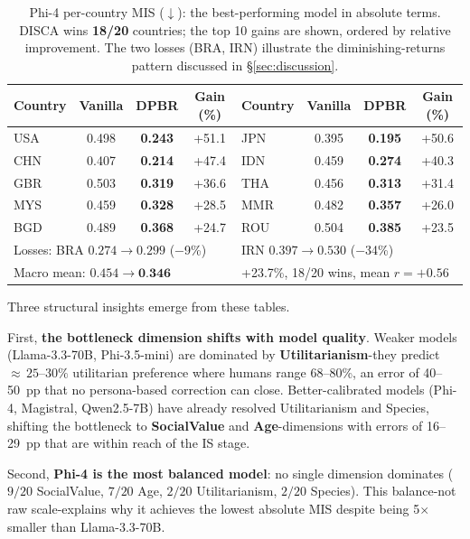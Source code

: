 \documentclass{article}
\newcommand{\gain}[1]{\textcolor{improvegreen}{#1}}
\newcommand{\loss}[1]{\textcolor{worsered}{#1}}
\begin{document}
\begin{table}[h]\centering\scriptsize
\caption{Phi-4 per-country MIS ($\downarrow$): the best-performing model in
absolute terms. DISCA wins \textbf{18/20} countries; the top 10 gains are
shown, ordered by relative improvement. The two losses (BRA, IRN) illustrate
the diminishing-returns pattern discussed in \S\ref{sec:discussion}.}
\label{tab:phi4_percountry}
\setlength{\tabcolsep}{4pt}
\begin{tabular}{lccc|lccc}\toprule
Country & Vanilla & DPBR & Gain (\%) & Country & Vanilla & DPBR & Gain (\%) \\\midrule
USA & 0.498 & \textbf{0.243} & \gain{+51.1} & JPN & 0.395 & \textbf{0.195} & \gain{+50.6} \\
CHN & 0.407 & \textbf{0.214} & \gain{+47.4} & IDN & 0.459 & \textbf{0.274} & \gain{+40.3} \\
GBR & 0.503 & \textbf{0.319} & \gain{+36.6} & THA & 0.456 & \textbf{0.313} & \gain{+31.4} \\
MYS & 0.459 & \textbf{0.328} & \gain{+28.5} & MMR & 0.482 & \textbf{0.357} & \gain{+26.0} \\
BGD & 0.489 & \textbf{0.368} & \gain{+24.7} & ROU & 0.504 & \textbf{0.385} & \gain{+23.5} \\
\midrule
\multicolumn{4}{l|}{Losses: BRA $0.274 \to 0.299$ (\loss{$-$9\%})} &
\multicolumn{4}{l}{IRN $0.397 \to 0.530$ (\loss{$-$34\%})} \\
\multicolumn{4}{l|}{Macro mean: $0.454 \to \textbf{0.346}$} &
\multicolumn{4}{l}{\gain{+23.7\%}, 18/20 wins, mean $r = +0.56$} \\
\bottomrule
\end{tabular}
\end{table}

Three structural insights emerge from these tables.

First, \textbf{the bottleneck dimension shifts with model quality}.
Weaker models (Llama-3.3-70B, Phi-3.5-mini) are dominated by
\textbf{Utilitarianism}-they predict ${\approx}\,25$--$30\%$ utilitarian
preference where humans range 68--80\%, an error of 40--50~pp that no
persona-based correction can close.
Better-calibrated models (Phi-4, Magistral, Qwen2.5-7B) have already resolved
Utilitarianism and Species, shifting the bottleneck to
\textbf{SocialValue} and \textbf{Age}-dimensions with errors of 16--29~pp
that are within reach of the IS stage.

Second, \textbf{Phi-4 is the most balanced model}: no single dimension
dominates ($9/20$ SocialValue, $7/20$ Age, $2/20$ Utilitarianism, $2/20$
Species). This balance-not raw scale-explains why it achieves the lowest
absolute MIS despite being 5$\times$ smaller than Llama-3.3-70B.
\end{document}
